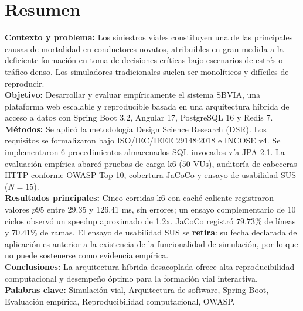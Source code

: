 \documentclass[11pt,a4paper]{report}
\begin{document}
\chapter*{Resumen}
\textbf{Contexto y problema:} Los siniestros viales constituyen una de las principales causas de mortalidad en conductores novatos, atribuibles en gran medida a la deficiente formación en toma de decisiones críticas bajo escenarios de estrés o tráfico denso. Los simuladores tradicionales suelen ser monolíticos y difíciles de reproducir. \\
\textbf{Objetivo:} Desarrollar y evaluar empíricamente el sistema SBVIA, una plataforma web escalable y reproducible basada en una arquitectura híbrida de acceso a datos con Spring Boot 3.2, Angular 17, PostgreSQL 16 y Redis 7. \\
\textbf{Métodos:} Se aplicó la metodología Design Science Research (DSR). Los requisitos se formalizaron bajo ISO/IEC/IEEE 29148:2018 e INCOSE v4. Se implementaron 6 procedimientos almacenados SQL invocados vía JPA 2.1. La evaluación empírica abarcó pruebas de carga k6 ($50\text{ VUs}$), auditoría de cabeceras HTTP conforme OWASP Top 10, cobertura JaCoCo y ensayo de usabilidad SUS ($N=15$). \\
\textbf{Resultados principales:} Cinco corridas k6 con caché caliente registraron valores $p95$ entre 29.35 y 126.41 ms, sin errores; un ensayo complementario de 10 ciclos observó un speedup aproximado de 1.2x. JaCoCo registró $79.73\%$ de líneas y $70.41\%$ de ramas. El ensayo de usabilidad SUS se \textbf{retira}: su fecha declarada de aplicación es anterior a la existencia de la funcionalidad de simulación, por lo que no puede sostenerse como evidencia empírica. \\
\textbf{Conclusiones:} La arquitectura híbrida desacoplada ofrece alta reproducibilidad computacional y desempeño óptimo para la formación vial interactiva. \\
\textbf{Palabras clave:} Simulación vial, Arquitectura de software, Spring Boot, Evaluación empírica, Reproducibilidad computacional, OWASP.
\end{document}
